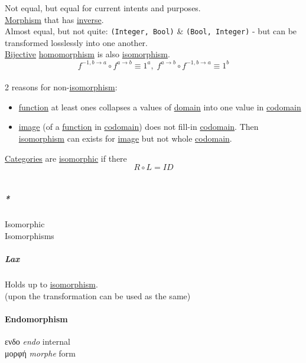 \documentclass[11pt]{article}
\begin{document}
Not equal, but equal for current intents and purposes.\\
\hyperref[org5de09d4]{Morphism} that has \hyperref[org0da4e7e]{inverse}.\\
Almost equal, but not quite: \texttt{(Integer, Bool)} \& \texttt{(Bool, Integer)} - but can be transformed losslessly into one another.\\

\hyperref[org13a0cd3]{Bijective} \hyperref[org4991058]{homomorphism} is also \hyperref[org91df03a]{isomorphism}.\\

$$ f^{-1, b \to a} \circ f^{a \to b} \equiv 1^a, \; f^{a \to b} \circ f^{-1, b \to a} \equiv 1^b $$\\

2 reasons for non-\hyperref[org91df03a]{isomorphism}:\\
\begin{itemize}
\item \hyperref[orge15bc14]{function} at least ones collapses a values of \hyperref[org494b48a]{domain} into one value in \hyperref[org410079d]{codomain}\\
\item \hyperref[orgef20814]{image} (of a \hyperref[orge15bc14]{function} in \hyperref[org410079d]{codomain}) does not fill-in \hyperref[org410079d]{codomain}. Then \hyperref[org91df03a]{isomorphism} can exists for \hyperref[orgef20814]{image} but not whole \hyperref[org410079d]{codomain}.\\
\end{itemize}

\hyperref[org2f49b91]{Categories} are \hyperref[org5910739]{isomorphic} if there $$ R \circ L = ID $$\\

\subparagraph{\emph{*}}
\label{sec:org230a62a}

\label{org5910739}Isomorphic\\
\label{org440791f}Isomorphisms\\

\subparagraph{\label{org40220c9}Lax}
\label{sec:org9ab7352}
Holds up to \hyperref[org91df03a]{isomorphism}.\\
(upon the transformation can be used as the same)\\

\paragraph{\label{orgcbe9cbb}Endomorphism}
\label{sec:orgdba697d}
ενδο \emph{endo} internal\\
μορφή \emph{morphe} form\\
\end{document}
